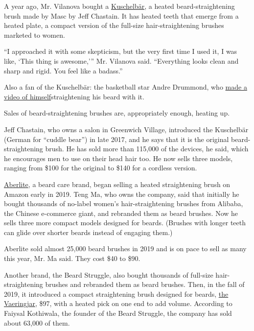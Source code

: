 A year ago, Mr. Vilanova bought a
\href{https://www.mascbyjeffchastain.com/collections/shop-all/products/kuschelbar\%C2\%AE-hair-and-beard-straightener}{Kuschelbär},
a heated beard-straightening brush made by Masc by Jeff Chastain. It has
heated teeth that emerge from a heated plate, a compact version of the
full-size hair-straightening brushes marketed to women.

``I approached it with some skepticism, but the very first time I used
it, I was like, `This thing is awesome,''' Mr. Vilanova said.
``Everything looks clean and sharp and rigid. You feel like a badass.''

Also a fan of the Kuschelbär: the basketball star Andre Drummond, who
\href{https://www.facebook.com/MASCbyjeffchastain/videos/nba-and-detroitpistons-star-andredrummondd-reached-out-to-me-a-couple-weeks-ago-/598722770629116/}{made
a video of himself}straightening his beard with it.

Sales of beard-straightening brushes are, appropriately enough, heating
up.

Jeff Chastain, who owns a salon in Greenwich Village, introduced the
Kuschelbär (German for ``cuddle bear'') in late 2017, and he says that
it is the original beard-straightening brush. He has sold more than
115,000 of the devices, he said, which he encourages men to use on their
head hair too. He now sells three models, ranging from \$100 for the
original to \$140 for a cordless version.

\href{https://www.aberlite.com/}{Aberlite}, a beard care brand, began
selling a heated straightening brush on Amazon early in 2019. Teng Ma,
who owns the company, said that initially he bought thousands of
no-label women's hair-straightening brushes from Alibaba, the Chinese
e-commerce giant, and rebranded them as beard brushes. Now he sells
three more compact models designed for beards. (Brushes with longer
teeth can glide over shorter beards instead of engaging them.)

Aberlite sold almost 25,000 beard brushes in 2019 and is on pace to sell
as many this year, Mr. Ma said. They cost \$40 to \$90.

Another brand, the Beard Struggle, also bought thousands of full-size
hair-straightening brushes and rebranded them as beard brushes. Then, in
the fall of 2019, it introduced a compact straightening brush designed
for beards,
\href{https://www.thebeardstruggle.com/collections/beard-care-products/products/ulfberht-heated-beard-comb}{the
Vaeringjar}, \$97, with a heated pick on one end to add volume.
According to Faiysal Kothiwala, the founder of the Beard Struggle, the
company has sold about 63,000 of them.

